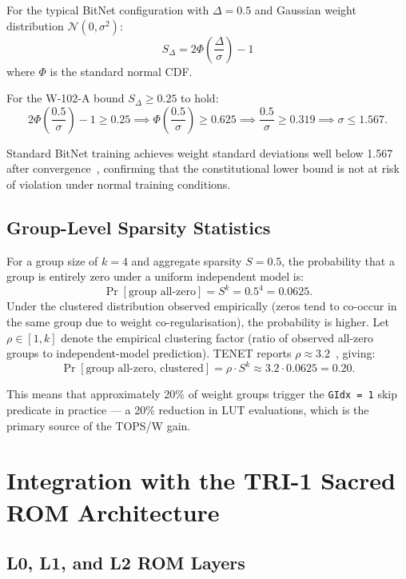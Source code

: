 For the typical BitNet configuration with $\Delta = 0.5$ and Gaussian
weight distribution $\mathcal{N}(0, \sigma^2)$:
\[
  S_{\Delta} = 2\Phi\!\left(\frac{\Delta}{\sigma}\right) - 1
\]
where $\Phi$ is the standard normal CDF.

For the W-102-A bound $S_{\Delta} \geq 0.25$ to hold:
\[
  2\Phi\!\left(\frac{0.5}{\sigma}\right) - 1 \geq 0.25
  \implies \Phi\!\left(\frac{0.5}{\sigma}\right) \geq 0.625
  \implies \frac{0.5}{\sigma} \geq 0.319
  \implies \sigma \leq 1.567.
\]

Standard BitNet training achieves weight standard deviations
well below 1.567 after convergence~\cite{huang2025tenet}, confirming
that the constitutional lower bound is not at risk of violation
under normal training conditions.

\subsection{Group-Level Sparsity Statistics}
\label{subsec:ch79-group-sparsity}

For a group size of $k = 4$ and aggregate sparsity $S = 0.5$,
the probability that a group is entirely zero under a uniform
independent model is:
\[
  \Pr[\text{group all-zero}] = S^k = 0.5^4 = 0.0625.
\]
Under the clustered distribution observed empirically (zeros
tend to co-occur in the same group due to weight co-regularisation),
the probability is higher.
Let $\rho \in [1, k]$ denote the empirical clustering factor
(ratio of observed all-zero groups to independent-model prediction).
TENET reports $\rho \approx 3.2$~\cite{huang2025tenet}, giving:
\[
  \Pr[\text{group all-zero, clustered}] = \rho \cdot S^k
    \approx 3.2 \cdot 0.0625 = 0.20.
\]

This means that approximately 20\% of weight groups trigger the
\texttt{GIdx = 1} skip predicate in practice --- a 20\% reduction
in LUT evaluations, which is the primary source of the TOPS/W gain.

\section{Integration with the TRI-1 Sacred ROM Architecture}
\label{sec:ch79-sacred-rom-integration}

\subsection{L0, L1, and L2 ROM Layers}
\label{subsec:ch79-rom-layers}

